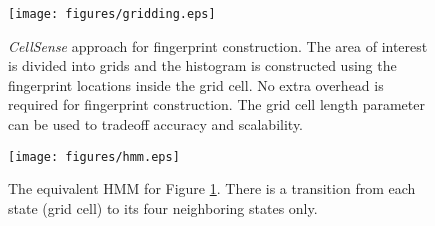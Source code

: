 \documentclass[conference]{IEEEtran}
\begin{document}
\begin{figure}[!t]
\centering
      \texttt{[image: figures/gridding.eps]}
  \caption{\textit{CellSense} approach for fingerprint construction. The area of interest is divided into grids and the histogram is constructed using the
  fingerprint locations inside the grid cell. No extra overhead is required for fingerprint construction. The grid cell length parameter can be used to tradeoff
  accuracy and scalability.}
  \label{fig:grid}
\end{figure}

\begin{figure}[!t]
\centering
      \texttt{[image: figures/hmm.eps]}
  \caption{The equivalent HMM for Figure \ref{fig:grid}. There is a transition from each state (grid cell) to its four neighboring states only.}
  \label{fig:hmm}
\end{figure}
\end{document}
